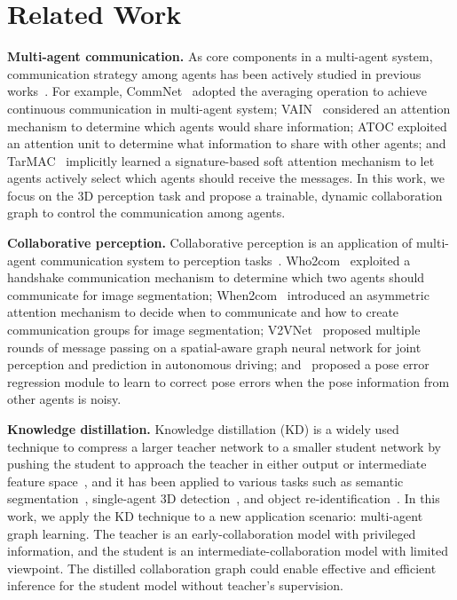 \documentclass{article}
\begin{document}
\vspace{-2mm}
\section{Related Work}\label{sec:related}
\vspace{-2mm}

\textbf{Multi-agent communication.} 
As core components in a multi-agent system, communication strategy among agents has been actively studied in previous works~\cite{shoham2008multiagent,Foerster2016LearningTC,singh2018learning}. For example, CommNet~\cite{Sukhbaatar2016LearningMC} adopted the averaging operation to achieve continuous communication in multi-agent system; VAIN~\cite{Hoshen2017VAINAM} considered an attention mechanism to determine which agents would share information; ATOC \cite{Jiang2018LearningAC} exploited an attention unit to determine what information to share with other agents; and TarMAC~\cite{das2019tarmac} implicitly learned a signature-based soft attention mechanism to let agents actively select which agents should receive the messages. In this work, we focus on the 3D perception task and propose a trainable, dynamic collaboration graph to control the communication among agents.

\textbf{Collaborative perception.} 
Collaborative perception is an application of multi-agent communication system to perception tasks~\cite{hadidi2018distributed,yue2020collaborative,khan2018towards}. Who2com~\cite{liu2020who2com} exploited a handshake communication mechanism to determine which two agents should communicate for image segmentation; When2com~\cite{liu2020when2com} introduced an asymmetric attention mechanism to decide when to communicate and how to create communication groups for image segmentation; V2VNet~\cite{wang2020v2vnet}
proposed multiple rounds of message passing on a spatial-aware graph neural network for joint perception and prediction in autonomous driving; and~\cite{Vadivelu2020LearningTC} proposed a pose error regression module to learn to correct pose errors when the pose information from other agents is noisy. 

\textbf{Knowledge distillation.} Knowledge distillation (KD) is a widely used technique to compress a larger teacher network to a smaller student network by pushing the student to approach the teacher in either output or intermediate feature space~\cite{hinton2015distilling}, and it has been applied to various tasks such as semantic segmentation~\cite{liu2019structured}, single-agent 3D detection~\cite{wang2020multi}, and object re-identification~\cite{jin2020uncertainty}. In this work, we apply the KD technique to a new application scenario: multi-agent graph learning. The teacher is an early-collaboration model with privileged information, and the student is an intermediate-collaboration model with limited viewpoint. The distilled collaboration graph could enable effective and efficient inference for the student model without teacher's supervision.
\end{document}
